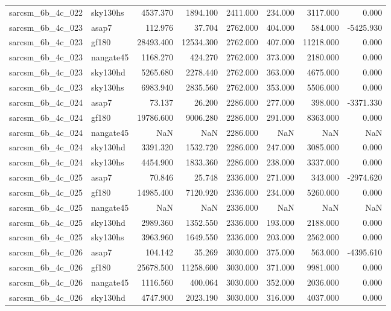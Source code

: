 \begin{tabular}{llrrrrrr}
sarcsm\_6b\_4c\_022 & sky130hs & 4537.370 & 1894.100 & 2411.000 & 234.000 & 3117.000 & 0.000 \\
sarcsm\_6b\_4c\_023 & asap7 & 112.976 & 37.704 & 2762.000 & 404.000 & 584.000 & -5425.930 \\
sarcsm\_6b\_4c\_023 & gf180 & 28493.400 & 12534.300 & 2762.000 & 407.000 & 11218.000 & 0.000 \\
sarcsm\_6b\_4c\_023 & nangate45 & 1168.270 & 424.270 & 2762.000 & 373.000 & 2180.000 & 0.000 \\
sarcsm\_6b\_4c\_023 & sky130hd & 5265.680 & 2278.440 & 2762.000 & 363.000 & 4675.000 & 0.000 \\
sarcsm\_6b\_4c\_023 & sky130hs & 6983.940 & 2835.560 & 2762.000 & 353.000 & 5506.000 & 0.000 \\
sarcsm\_6b\_4c\_024 & asap7 & 73.137 & 26.200 & 2286.000 & 277.000 & 398.000 & -3371.330 \\
sarcsm\_6b\_4c\_024 & gf180 & 19786.600 & 9006.280 & 2286.000 & 291.000 & 8363.000 & 0.000 \\
sarcsm\_6b\_4c\_024 & nangate45 & NaN & NaN & 2286.000 & NaN & NaN & NaN \\
sarcsm\_6b\_4c\_024 & sky130hd & 3391.320 & 1532.720 & 2286.000 & 247.000 & 3085.000 & 0.000 \\
sarcsm\_6b\_4c\_024 & sky130hs & 4454.900 & 1833.360 & 2286.000 & 238.000 & 3337.000 & 0.000 \\
sarcsm\_6b\_4c\_025 & asap7 & 70.846 & 25.748 & 2336.000 & 271.000 & 343.000 & -2974.620 \\
sarcsm\_6b\_4c\_025 & gf180 & 14985.400 & 7120.920 & 2336.000 & 234.000 & 5260.000 & 0.000 \\
sarcsm\_6b\_4c\_025 & nangate45 & NaN & NaN & 2336.000 & NaN & NaN & NaN \\
sarcsm\_6b\_4c\_025 & sky130hd & 2989.360 & 1352.550 & 2336.000 & 193.000 & 2188.000 & 0.000 \\
sarcsm\_6b\_4c\_025 & sky130hs & 3963.960 & 1649.550 & 2336.000 & 203.000 & 2562.000 & 0.000 \\
sarcsm\_6b\_4c\_026 & asap7 & 104.142 & 35.269 & 3030.000 & 375.000 & 563.000 & -4395.610 \\
sarcsm\_6b\_4c\_026 & gf180 & 25678.500 & 11258.600 & 3030.000 & 371.000 & 9981.000 & 0.000 \\
sarcsm\_6b\_4c\_026 & nangate45 & 1116.560 & 400.064 & 3030.000 & 352.000 & 2036.000 & 0.000 \\
sarcsm\_6b\_4c\_026 & sky130hd & 4747.900 & 2023.190 & 3030.000 & 316.000 & 4037.000 & 0.000 \\

\end{tabular}
